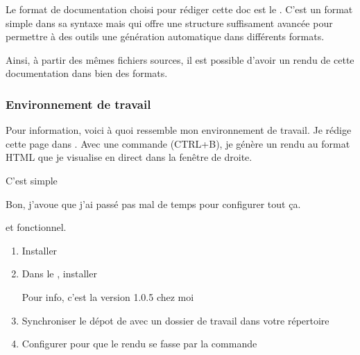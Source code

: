 \documentclass[letterpaper,10pt,french]{sphinxmanual}
\begin{document}
Le format de documentation choisi pour rédiger cette doc est le .
C’est un format  simple dans sa syntaxe mais qui offre une structure
suffisament avancée pour permettre à des outils une génération automatique dans différents
formats.

Ainsi, à partir des mêmes fichiers sources, il est possible d’avoir un rendu de cette
documentation dans bien des formats.


\subsubsection{Environnement de travail}
\label{\detokenize{projet-aPropos:environnement-de-travail}}
Pour information, voici à quoi ressemble mon environnement de travail.
Je rédige cette page dans . Avec une commande (CTRL+B), je génère un rendu
au format HTML que je visualise en direct dans la fenêtre de droite.


C’est  simple %
\begin{footnote}[1]\sphinxAtStartFootnote
Bon, j’avoue que j’ai passé pas mal de temps pour configurer tout ça.
%
\end{footnote} et fonctionnel.
\begin{enumerate}
\item {} 
Installer 

\item {} 
Dans le , installer  %
\begin{footnote}[2]\sphinxAtStartFootnote
Pour info, c’est la version 1.0.5 chez moi
%
\end{footnote}

\item {} 
Synchroniser le dépot de  avec un dossier de travail dans votre répertoire

\item {} 
Configurer  pour que le rendu se fasse par la commande 

\end{enumerate}
\end{document}
